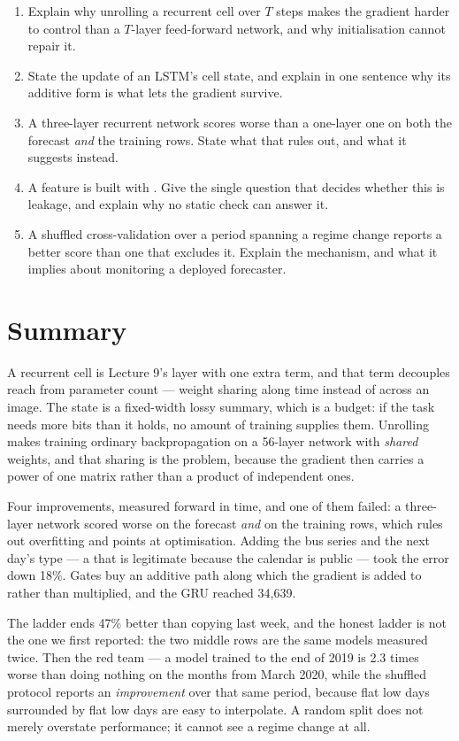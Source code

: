 \documentclass[11pt,a4paper]{article}
\begin{document}
\begin{enumerate}[leftmargin=1.6em,itemsep=4pt]
  \item Explain why unrolling a recurrent cell over $T$ steps makes the
        gradient harder to control than a $T$-layer feed-forward network, and
        why initialisation cannot repair it. \hfill \scope{[5]}
  \item State the update of an LSTM's cell state, and explain in one sentence
        why its additive form is what lets the gradient survive.
        \hfill \scope{[4]}
  \item A three-layer recurrent network scores worse than a one-layer one on
        both the forecast \emph{and} the training rows. State what that rules
        out, and what it suggests instead. \hfill \scope{[4]}
  \item A feature is built with . Give the single question that
        decides whether this is leakage, and explain why no static check can
        answer it. \hfill \scope{[4]}
  \item A shuffled cross-validation over a period spanning a regime change
        reports a better score than one that excludes it. Explain the
        mechanism, and what it implies about monitoring a deployed forecaster.
        \hfill \scope{[5]}
\end{enumerate}

\section*{Summary}

A recurrent cell is Lecture 9's layer with one extra term, and that term
decouples reach from parameter count --- weight sharing along time instead of
across an image. The state is a fixed-width lossy summary, which is a budget:
if the task needs more bits than it holds, no amount of training supplies them.
Unrolling makes training ordinary backpropagation on a 56-layer network with
\emph{shared} weights, and that sharing is the problem, because the gradient
then carries a power of one matrix rather than a product of independent ones.

Four improvements, measured forward in time, and one of them failed: a
three-layer network scored worse on the forecast \emph{and} on the training
rows, which rules out overfitting and points at optimisation. Adding the bus
series and the next day's type --- a  that is legitimate
because the calendar is public --- took the error down 18\%. Gates buy an
additive path along which the gradient is added to rather than multiplied, and
the GRU reached 34{,}639.

The ladder ends 47\% better than copying last week, and the honest ladder is
not the one we first reported: the two middle rows are the same models measured
twice. Then the red team --- a model trained to the end of 2019 is 2.3 times
worse than doing nothing on the months from March 2020, while the shuffled
protocol reports an \emph{improvement} over that same period, because flat low
days surrounded by flat low days are easy to interpolate. A random split does
not merely overstate performance; it cannot see a regime change at all.
\end{document}

